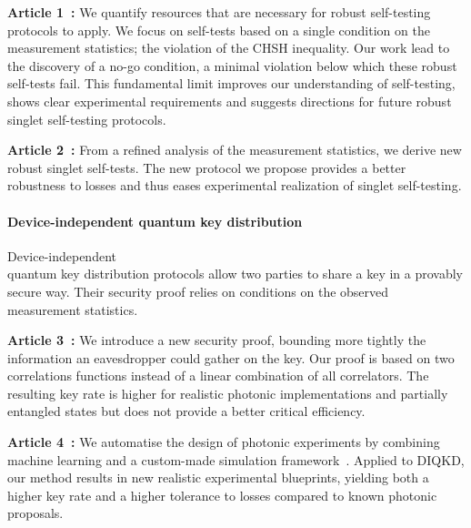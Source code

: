 \textbf{Article 1~\cite{Valcarce2020}:} We quantify resources that are necessary for robust self-testing protocols to apply.
We focus on self-tests based on a single condition on the measurement statistics; the violation of the CHSH inequality.
Our work lead to the discovery of a no-go condition, a minimal violation below which these robust self-tests fail.
This fundamental limit improves our understanding of self-testing, shows clear experimental requirements and suggests directions for future robust singlet self-testing protocols.

\textbf{Article 2~\cite{Valcarce2022}:} From a refined analysis of the measurement statistics, we derive new robust singlet self-tests.
The new protocol we propose provides a better robustness to losses and thus eases experimental realization of singlet self-testing.

\paragraph{Device-independent quantum key distribution}

Device-independent \\ quantum key distribution protocols allow two parties to share a key in a provably secure way.
Their security proof relies on conditions on the observed measurement statistics. 

\medbreak

\textbf{Article 3~\cite{Sekatski2021}:} We introduce a new security proof, bounding more tightly the information an eavesdropper could gather on the key.
Our proof is based on two correlations functions instead of a linear combination of all correlators.
The resulting key rate is higher for realistic photonic implementations and partially entangled states but does not provide a better critical efficiency.

\textbf{Article 4~\cite{Valcarce2022b}:} We automatise the design of photonic experiments by combining machine learning and a custom-made simulation framework~\cite{Valcarce2021}. Applied to DIQKD, our method results in new realistic experimental blueprints, yielding both a higher key rate and a higher tolerance to losses compared to known photonic proposals.


